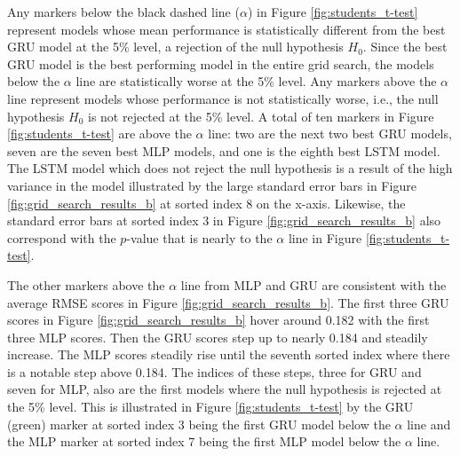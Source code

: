 Any markers below the black dashed line ($\alpha$) in Figure \ref{fig:students_t-test} represent models whose mean performance is statistically different from the best GRU model at the 5\% level, a rejection of the null hypothesis $H_{0}$. Since the best GRU model is the best performing model in the entire grid search, the models below the $\alpha$ line are statistically worse at the 5\% level. Any markers above the $\alpha$ line represent models whose performance is not statistically worse, i.e., the null hypothesis $H_{0}$ is not rejected at the 5\% level. A total of ten markers in Figure \ref{fig:students_t-test} are above the $\alpha$ line: two are the next two best GRU models, seven are the seven best MLP models, and one is the eighth best LSTM model. The LSTM model which does not reject the null hypothesis is a result of the high variance in the model illustrated by the large standard error bars in Figure \ref{fig:grid_search_results_b} at sorted index 8 on the x-axis. Likewise, the standard error bars at sorted index 3 in Figure \ref{fig:grid_search_results_b} also correspond with the $p$-value that is nearly to the $\alpha$ line in Figure \ref{fig:students_t-test}.

The other markers above the $\alpha$ line from MLP and GRU are consistent with the average RMSE scores in Figure \ref{fig:grid_search_results_b}. The first three GRU scores in Figure \ref{fig:grid_search_results_b} hover around 0.182 with the first three MLP scores. Then the GRU scores step up to nearly 0.184 and steadily increase. The MLP scores steadily rise until the seventh sorted index where there is a notable step above 0.184. The indices of these steps, three for GRU and seven for MLP, also are the first models where the null hypothesis is rejected at the 5\% level. This is illustrated in Figure \ref{fig:students_t-test} by the GRU (green) marker at sorted index 3 being the first GRU model below the $\alpha$ line and the MLP marker at sorted index 7 being the first MLP model below the $\alpha$ line.

